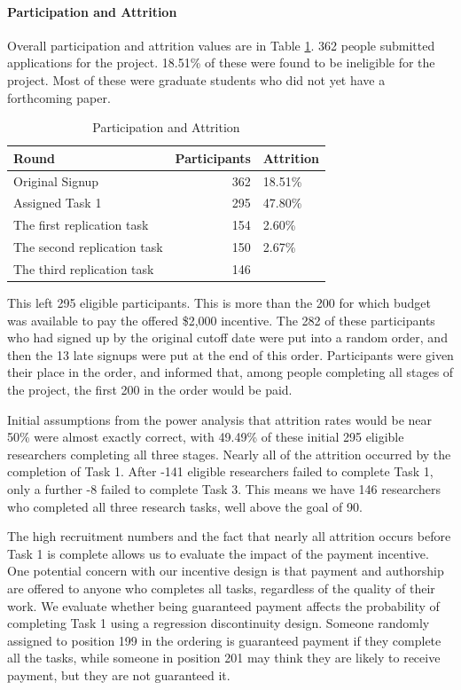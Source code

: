 \documentclass[
  letterpaper,
  DIV=11,
  numbers=noendperiod]{scrartcl}
\let\oldparagraph\paragraph
\renewcommand{\paragraph}[1]{\oldparagraph{#1}\mbox{}}
\begin{document}
\hypertarget{participation-and-attrition}{%
\paragraph{Participation and
Attrition}\label{participation-and-attrition}}

Overall participation and attrition values are in Table
\ref{tbl-attrition}. 362 people submitted applications for the project.
18.51\% of these were found to be ineligible for the project. Most of
these were graduate students who did not yet have a forthcoming paper.

\hypertarget{tbl-attrition}{}
\begin{table}
\caption{\label{tbl-attrition}Participation and Attrition }\tabularnewline

\centering
\begin{tabular}{lrl}
\toprule
Round & Participants & Attrition\\
\midrule
Original Signup & 362 & 18.51\%\\
Assigned Task 1 & 295 & 47.80\%\\
The first replication task & 154 & 2.60\%\\
The second replication task & 150 & 2.67\%\\
The third replication task & 146 & \\
\bottomrule
\end{tabular}
\end{table}

This left 295 eligible participants. This is more than the 200 for which
budget was available to pay the offered \$2,000 incentive. The 282 of
these participants who had signed up by the original cutoff date were
put into a random order, and then the 13 late signups were put at the
end of this order. Participants were given their place in the order, and
informed that, among people completing all stages of the project, the
first 200 in the order would be paid.

Initial assumptions from the power analysis that attrition rates would
be near 50\% were almost exactly correct, with 49.49\% of these initial
295 eligible researchers completing all three stages. Nearly all of the
attrition occurred by the completion of Task 1. After -141 eligible
researchers failed to complete Task 1, only a further -8 failed to
complete Task 3. This means we have 146 researchers who completed all
three research tasks, well above the goal of 90.

The high recruitment numbers and the fact that nearly all attrition
occurs before Task 1 is complete allows us to evaluate the impact of the
payment incentive. One potential concern with our incentive design is
that payment and authorship are offered to anyone who completes all
tasks, regardless of the quality of their work. We evaluate whether
being guaranteed payment affects the probability of completing Task 1
using a regression discontinuity design. Someone randomly assigned to
position 199 in the ordering is guaranteed payment if they complete all
the tasks, while someone in position 201 may think they are likely to
receive payment, but they are not guaranteed it.
\end{document}
